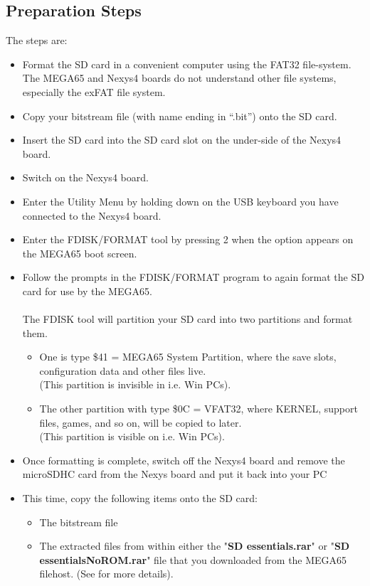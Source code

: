 \subsection{Preparation Steps}

The steps are:

\begin{itemize}
  \item{Format the SD card} in a convenient computer using the FAT32 file-system.  The MEGA65 and Nexys4 boards do not understand other
file systems, especially the exFAT file system.
\item{Copy} your bitstream file (with name ending in ``.bit'') onto the SD card.
\item{Insert} the SD card into the SD card slot on the under-side of the Nexys4 board.
\item{Switch on} the Nexys4 board.
\item{Enter the Utility Menu} by holding  down on the USB keyboard you have connected to the Nexys4 board.
\item{Enter the FDISK/FORMAT tool} by pressing 2 when the option appears on the MEGA65 boot screen.
\item{Follow the prompts} in the FDISK/FORMAT program to again format the SD card for use by the MEGA65. \\
  \\
  The FDISK tool will partition your SD card into two partitions and format them.
  \begin{itemize}
    \item One is type \$41 = MEGA65 System Partition, where the save slots, configuration data and other files live. \\
  (This partition is invisible in i.e. Win PCs).
    \item The other partition with type \$0C = VFAT32, where KERNEL, support files, games, and so on, will be copied to later. \\
  (This partition is visible on i.e. Win PCs).
  \end{itemize}
\item{Once formatting is complete}, switch off the Nexys4 board and remove the microSDHC card from the Nexys board and put it back into your PC
\item{This time, copy} the following items onto the SD card:
  \begin{itemize}
    \item The bitstream file
    \item The extracted files from within either the "\textbf{SD essentials.rar}" or "\textbf{SD essentialsNoROM.rar}" file that you downloaded from the MEGA65 filehost. (See  for more details).

\end{itemize}
\end{itemize}
